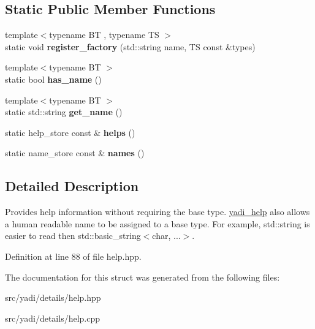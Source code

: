 \subsection*{Static Public Member Functions}
\begin{DoxyCompactItemize}
\item 
\mbox{\label{structyadi_1_1yadi__help_add1c3496248cd02834c8bd835d4ac417}} 
{\footnotesize template$<$typename BT , typename TS $>$ }\\static void {\bfseries register\+\_\+factory} (std\+::string name, TS const \&types)
\item 
\mbox{\label{structyadi_1_1yadi__help_ade91b0fb56b72ee34c7e3be193faac02}} 
{\footnotesize template$<$typename BT $>$ }\\static bool {\bfseries has\+\_\+name} ()
\item 
\mbox{\label{structyadi_1_1yadi__help_a106e37c78f02730ba7d54f9892932ede}} 
{\footnotesize template$<$typename BT $>$ }\\static std\+::string {\bfseries get\+\_\+name} ()
\item 
\mbox{\label{structyadi_1_1yadi__help_a9ddef20988be744f132c45009a4c3810}} 
static help\+\_\+store const  \& {\bfseries helps} ()
\item 
\mbox{\label{structyadi_1_1yadi__help_a41fb4a566cae38f7530d1c9f08f72a8f}} 
static name\+\_\+store const  \& {\bfseries names} ()
\end{DoxyCompactItemize}


\subsection{Detailed Description}
Provides help information without requiring the base type. \hyperlink{structyadi_1_1yadi__help}{yadi\+\_\+help} also allows a human readable name to be assigned to a base type. For example, std\+::string is easier to read then std\+::basic\+\_\+string$<$char, ...$>$. 

Definition at line 88 of file help.\+hpp.



The documentation for this struct was generated from the following files\+:\begin{DoxyCompactItemize}
\item 
src/yadi/details/help.\+hpp\item 
src/yadi/details/help.\+cpp\end{DoxyCompactItemize}
